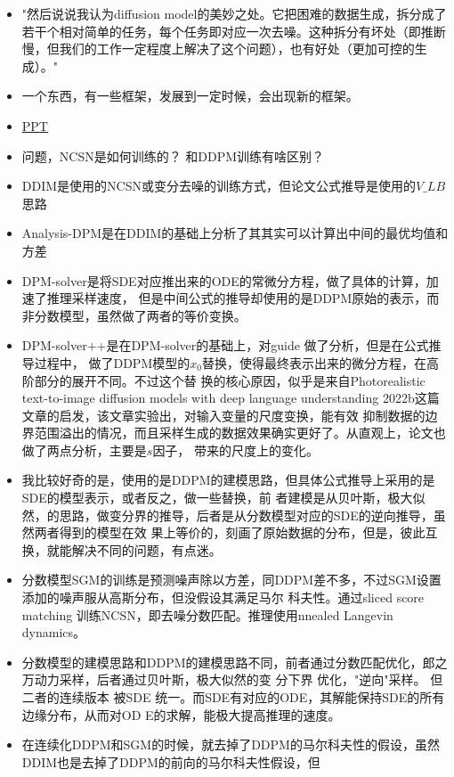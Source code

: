 \documentclass[lang=cn,newtx,10pt,scheme=chinese]{elegantbook}
\begin{document}
\begin{itemize}
  \item "然后说说我认为diffusion model的美妙之处。它把困难的数据生成，拆分成了若干个相对简单的任务，每个任务即对应一次去噪。这种拆分有坏处（即推断慢，但我们的工作一定程度上解决了这个问题），也有好处（更加可控的生成）。"

  \item 一个东西，有一些框架，发展到一定时候，会出现新的框架。
  \item \href{https://ml.cs.tsinghua.edu.cn/~fanbao/Application-DPM.pdf}{PPT}
  \item 问题，NCSN是如何训练的？ 和DDPM训练有啥区别？
  \item DDIM是使用的NCSN或变分去噪的训练方式，但论文公式推导是使用的$V\_LB$思路
  \item Analysis-DPM是在DDIM的基础上分析了其其实可以计算出中间的最优均值和方差
  \item DPM-solver是将SDE对应推出来的ODE的常微分方程，做了具体的计算，加速了推理采样速度，
  但是中间公式的推导却使用的是DDPM原始的表示，而非分数模型，虽然做了两者的等价变换。
  \item DPM-solver++是在DPM-solver的基础上，对guide 做了分析，但是在公式推导过程中，
  做了DDPM模型的$x_0$替换，使得最终表示出来的微分方程，在高阶部分的展开不同。不过这个替
  换的核心原因，似乎是来自Photorealistic text-to-image diffusion models with deep 
  language understanding 2022b这篇文章的启发，该文章实验出，对输入变量的尺度变换，能有效
  抑制数据的边界范围溢出的情况，而且采样生成的数据效果确实更好了。从直观上，论文也做了两点分析，主要是$s$因子，
  带来的尺度上的变化。
  \item 我比较好奇的是，使用的是DDPM的建模思路，但具体公式推导上采用的是SDE的模型表示，或者反之，做一些替换，前
  者建模是从贝叶斯，极大似然，的思路，做变分界的推导，后者是从分数模型对应的SDE的逆向推导，虽然两者得到的模型在效
  果上等价的，刻画了原始数据的分布，但是，彼此互换，就能解决不同的问题，有点迷。
  \item 分数模型SGM的训练是预测噪声除以方差，同DDPM差不多，不过SGM设置添加的噪声服从高斯分布，但没假设其满足马尔
  科夫性。通过sliced score matching 训练NCSN，即去噪分数匹配。推理使用nnealed Langevin dynamics。
  \item 分数模型的建模思路和DDPM的建模思路不同，前者通过分数匹配优化，郎之万动力采样，后者通过贝叶斯，极大似然的变
  分下界 优化，"逆向"采样。 但二者的连续版本 被SDE 统一。而SDE有对应的ODE，其解能保持SDE的所有边缘分布，从而对OD
  E的求解，能极大提高推理的速度。
  \item 在连续化DDPM和SGM的时候，就去掉了DDPM的马尔科夫性的假设，虽然DDIM也是去掉了DDPM的前向的马尔科夫性假设，但

\end{itemize}
\end{document}
